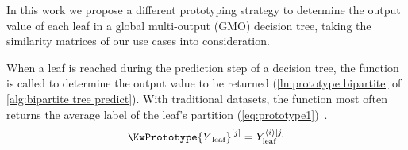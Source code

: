 In this work we propose a different prototyping strategy to determine the output value of each leaf in a global multi-output (GMO) decision tree, taking the similarity matrices of our use cases into consideration.

When a leaf is reached during the prediction step of a decision tree, the \KwPrototype function is called to determine the output value to be returned (\autoref{ln:prototype bipartite} of \autoref{alg:bipartite tree predict}).
%
\algBipartiteTreePredict
%
With traditional datasets, the \KwPrototype function
most often returns the average label of the leaf's partition (\autoref{eq:prototype1})~\cite{breiman1984classification}.
%
\begin{equation}
    \KwPrototype{Y\textsubscript{leaf}}\el j=Y_\text{leaf}^{\ang{i}[j]}
    \label{eq:prototype1}
\end{equation}

